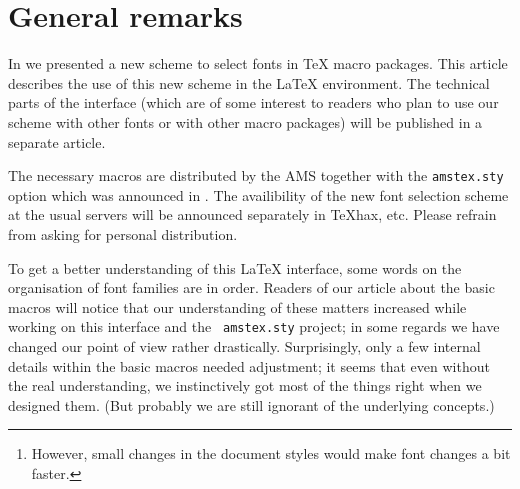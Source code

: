 \selectfont
 
 
 
 
 \maketitle
 
 
 \tableofcontents
 
 \begin{abstract}
   In this article we describe the use of the new font selection scheme
   in the standard \LaTeX{} environment.
   The main characteristics are:
   \begin{itemize}
      \item
        The possibility to change family, series, shape and sizes
        independently of one another.
      \item
        The existence of a style file to process older documents
        without any changes to their layout and their input files.
      \item
	A macro setup which is consistent with existing standard
        document styles.\footnote{However, small changes in the document
                                  styles would make font changes a bit
                                  faster.}
   \end{itemize}
   It is planned to incorporate this font selection scheme into
   \LaTeX{} version 2.10.
 \end{abstract}
 
 \section{General remarks}
 
 In  we presented a new scheme to select fonts in \TeX{}
 macro packages.  This article describes the use of this new scheme in
 the \LaTeX{} environment.  The technical parts of the interface (which
 are of some interest to readers who plan to use our scheme with
 other fonts or with other macro packages) will be published in a
 separate article.
 
 The necessary macros are distributed by the AMS together with the
 {\tt amstex.sty} option which was announced in .
 The availibility of the new font selection scheme at the usual
 servers will be announced separately in \TeX{}hax, etc. Please
 refrain from asking for personal distribution.
 
 To get a better understanding of this \LaTeX{} interface, some words on
 the organisation of font families are in order.  Readers of our
 article about the basic macros will notice that our understanding of
 these matters increased while working on this interface and the {\tt
 amstex.sty} project; in some regards we have changed our point of view
 rather drastically.
 Surprisingly, only a few internal details within the basic
 macros needed adjustment; it seems that even without the real
 understanding, we
 instinctively got most of the things right when we designed them.  (But
 probably we  are still ignorant of the underlying concepts.)
 
